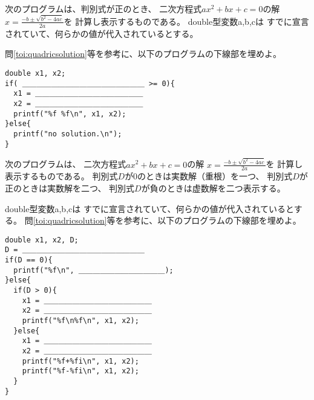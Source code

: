 \documentclass[12pt,a4j]{jarticle}
\newcounter{toi}
\def\toi{%
\bigskip\bigskip\noindent
\addtocounter{toi}{1}
\shadowbox{\bfseries\large 問\thetoi}
\nopagebreak[4]\bigskip\nopagebreak[4]
}
\begin{document}




\toi


次のプログラムは、判別式が正のとき、
二次方程式$ax^2+bx+c=0$の解
$x=\displaystyle\frac{-b\pm\sqrt{b^2-4ac}}{2a}$を
計算し表示するものである。
{\ttfamily double}型変数{\ttfamily a,b,c}は
すでに宣言されていて、何らかの値が代入されているとする。

問\ref{toi:quadricsolution}等を参考に、以下のプログラムの下線部を埋めよ。
\begin{verbatim}
double x1, x2;
if( ＿＿＿＿＿＿＿＿＿＿＿＿＿＿＿＿＿ >= 0){
  x1 = ＿＿＿＿＿＿＿＿＿＿＿＿＿＿＿
  x2 = ＿＿＿＿＿＿＿＿＿＿＿＿＿＿＿
  printf("%f %f\n", x1, x2);
}else{
  printf("no solution.\n");
}
\end{verbatim}




\toi


次のプログラムは、
二次方程式$ax^2+bx+c=0$の解
$x=\displaystyle\frac{-b\pm\sqrt{b^2-4ac}}{2a}$を
計算し表示するものである。
判別式$D$が0のときは実数解（重根）を一つ、
判別式$D$が正のときは実数解を二つ、
判別式$D$が負のときは虚数解を二つ表示する。

{\ttfamily double}型変数{\ttfamily a,b,c}は
すでに宣言されていて、何らかの値が代入されているとする。
問\ref{toi:quadricsolution}等を参考に、以下のプログラムの下線部を埋めよ。
\begin{verbatim}
double x1, x2, D;
D = ＿＿＿＿＿＿＿＿＿＿＿＿＿＿＿＿＿
if(D == 0){
  printf("%f\n", ＿＿＿＿＿＿＿＿＿＿＿＿);
}else{
  if(D > 0){
    x1 = ＿＿＿＿＿＿＿＿＿＿＿＿＿＿＿
    x2 = ＿＿＿＿＿＿＿＿＿＿＿＿＿＿＿
    printf("%f\n%f\n", x1, x2);
  }else{
    x1 = ＿＿＿＿＿＿＿＿＿＿＿＿＿＿＿
    x2 = ＿＿＿＿＿＿＿＿＿＿＿＿＿＿＿
    printf("%f+%fi\n", x1, x2);
    printf("%f-%fi\n", x1, x2);
  }
}
\end{verbatim}


\end{document}
